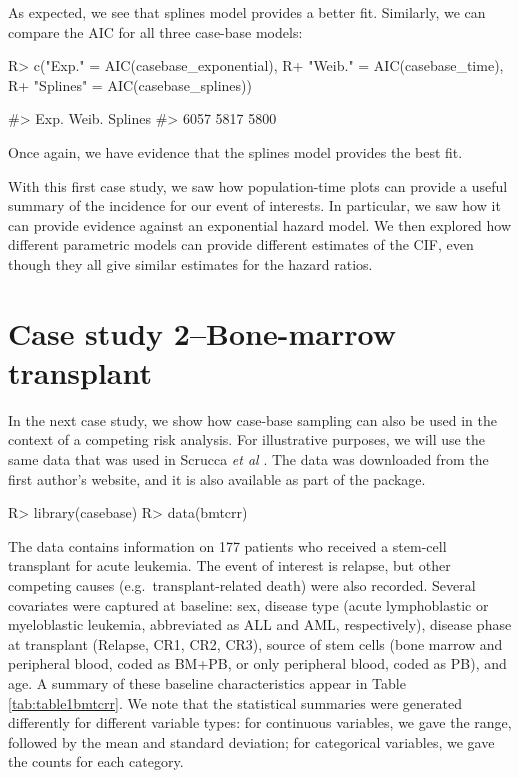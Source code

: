 \documentclass[
]{jss}
\begin{document}
As expected, we see that splines model provides a better fit. Similarly,
we can compare the AIC for all three case-base models:

\begin{CodeChunk}

\begin{CodeInput}
R> c("Exp." = AIC(casebase_exponential),
R+   "Weib." = AIC(casebase_time),
R+   "Splines" = AIC(casebase_splines))
\end{CodeInput}

\begin{CodeOutput}
#>    Exp.   Weib. Splines 
#>    6057    5817    5800
\end{CodeOutput}
\end{CodeChunk}

Once again, we have evidence that the splines model provides the best
fit.

With this first case study, we saw how population-time plots can provide
a useful summary of the incidence for our event of interests. In
particular, we saw how it can provide evidence against an exponential
hazard model. We then explored how different parametric models can
provide different estimates of the CIF, even though they all give
similar estimates for the hazard ratios.

\hypertarget{case-study-2bone-marrow-transplant}{%
\section{Case study 2--Bone-marrow
transplant}\label{case-study-2bone-marrow-transplant}}

In the next case study, we show how case-base sampling can also be used
in the context of a competing risk analysis. For illustrative purposes,
we will use the same data that was used in Scrucca \emph{et al}
\citeyearpar{scrucca2010regression}. The data was downloaded from the
first author's website, and it is also available as part of the
 package.

\begin{CodeChunk}

\begin{CodeInput}
R> library(casebase)
R> data(bmtcrr)
\end{CodeInput}
\end{CodeChunk}

The data contains information on 177 patients who received a stem-cell
transplant for acute leukemia. The event of interest is relapse, but
other competing causes (e.g.~transplant-related death) were also
recorded. Several covariates were captured at baseline: sex, disease
type (acute lymphoblastic or myeloblastic leukemia, abbreviated as ALL
and AML, respectively), disease phase at transplant (Relapse, CR1, CR2,
CR3), source of stem cells (bone marrow and peripheral blood, coded as
BM+PB, or only peripheral blood, coded as PB), and age. A summary of
these baseline characteristics appear in Table \ref{tab:table1bmtcrr}.
We note that the statistical summaries were generated differently for
different variable types: for continuous variables, we gave the range,
followed by the mean and standard deviation; for categorical variables,
we gave the counts for each category.
\end{document}
